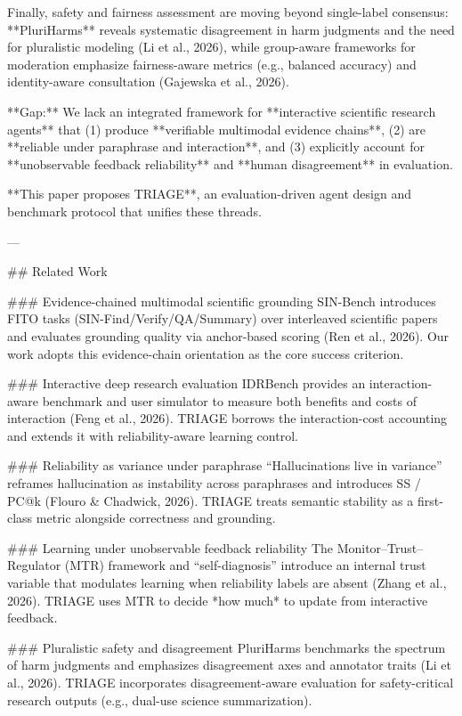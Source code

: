 Finally, safety and fairness assessment are moving beyond single-label consensus: **PluriHarms** reveals systematic disagreement in harm judgments and the need for pluralistic modeling (Li et al., 2026), while group-aware frameworks for moderation emphasize fairness-aware metrics (e.g., balanced accuracy) and identity-aware consultation (Gajewska et al., 2026).  

**Gap:** We lack an integrated framework for **interactive scientific research agents** that (1) produce **verifiable multimodal evidence chains**, (2) are **reliable under paraphrase and interaction**, and (3) explicitly account for **unobservable feedback reliability** and **human disagreement** in evaluation.  

**This paper proposes TRIAGE**, an evaluation-driven agent design and benchmark protocol that unifies these threads.

---

## Related Work  

### Evidence-chained multimodal scientific grounding  
SIN-Bench introduces FITO tasks (SIN-Find/Verify/QA/Summary) over interleaved scientific papers and evaluates grounding quality via anchor-based scoring (Ren et al., 2026). Our work adopts this evidence-chain orientation as the core success criterion.

### Interactive deep research evaluation  
IDRBench provides an interaction-aware benchmark and user simulator to measure both benefits and costs of interaction (Feng et al., 2026). TRIAGE borrows the interaction-cost accounting and extends it with reliability-aware learning control.

### Reliability as variance under paraphrase  
“Hallucinations live in variance” reframes hallucination as instability across paraphrases and introduces SS / PC@k (Flouro & Chadwick, 2026). TRIAGE treats semantic stability as a first-class metric alongside correctness and grounding.

### Learning under unobservable feedback reliability  
The Monitor–Trust–Regulator (MTR) framework and “self-diagnosis” introduce an internal trust variable that modulates learning when reliability labels are absent (Zhang et al., 2026). TRIAGE uses MTR to decide *how much* to update from interactive feedback.

### Pluralistic safety and disagreement  
PluriHarms benchmarks the spectrum of harm judgments and emphasizes disagreement axes and annotator traits (Li et al., 2026). TRIAGE incorporates disagreement-aware evaluation for safety-critical research outputs (e.g., dual-use science summarization).

